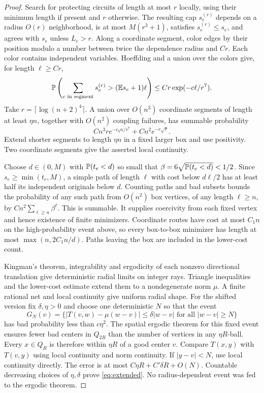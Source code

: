 \begin{proof}
Search for protecting circuits of length at most $r$ locally, using their
minimum length if present and $r$ otherwise. The resulting cap $s_e^{(r)}$
depends on a radius $O(r)$ neighborhood, is at most $M(r^3+1)$, satisfies
$s_e^{(r)}\le s_e$, and agrees with $s_e$ unless $L_e>r$.
Along a coordinate segment, color edges by their position modulo a number
between twice the dependence radius and $Cr$. Each color contains independent
variables. Hoeffding and a union over the colors give, for length $\ell\ge Cr$,
\[
 \mathbb P\left(\sum_{e\text{ in segment}}s_e^{(r)}>(\mathbb E s_e+1)\ell\right)
 \le Cr\exp(-c\ell/r^7).
\]
Take $r=\lceil\log(n+2)^4\rceil$. A union over $O(n^3)$ coordinate segments
of length at least $\eta n$, together with $O(n^2)$ coupling failures, has
summable probability
\[
 Cn^3r e^{-c_\eta n/r^7}+Cn^2e^{-c\sqrt r}.
\]
Extend shorter segments to length $\eta n$ in a fixed larger box and use
positivity. Two coordinate segments give the asserted local continuity.

Choose $d\in(0,M)$ with $\mathbb P(t_e<d)$ so small that
$\beta=6\sqrt{\mathbb P(t_e<d)}<1/2$. Since $s_e\ge\min(t_e,M)$, a simple
path of length $\ell$ with cost below $d\ell/2$ has at least half its
independent originals below $d$. Counting paths and bad subsets bounds the
probability of any such path from $O(n^2)$ box vertices, of any length
$\ell\ge n$, by $Cn^2\sum_{\ell\ge n}\beta^\ell$. This is summable.
It supplies coercivity from each fixed vertex and hence existence of finite
minimizers. Coordinate routes have cost at most $C_1n$ on the high-probability
event above, so every box-to-box minimizer has length at most
$\max(n,2C_1n/d)$. Paths leaving the box are included in the lower-cost count.

Kingman's theorem, integrability and ergodicity of each nonzero directional
translation give deterministic radial limits on integer rays. Triangle
inequalities and the lower-cost estimate extend them to a nondegenerate norm
$\mu$. A finite rational net and local continuity give uniform radial shape.
For the shifted version fix $\delta,\eta>0$ and choose one deterministic $N$
so that the event
\[
 G_N(v)=\{|T(v,w)-\mu(w-v)|\le\delta|w-v|
                 \text{ for all }|w-v|\ge N\}
\]
has bad probability less than $c\eta^2$. The spatial ergodic theorem for
this fixed event ensures fewer bad centers in $Q_{2R}$ than the number
of vertices in any $\eta R$-ball. Every $x\in Q_R$ is therefore within
$\eta R$ of a good center $v$. Compare $T(x,y)$ with $T(v,y)$ using local
continuity and norm continuity. If $|y-v|<N$, use local continuity directly.
The error is at most $C\eta R+C'\delta R+O(N)$. Countable decreasing choices
of $\eta,\delta$ prove \eqref{eq:extended}. No radius-dependent event was
fed to the ergodic theorem.
\end{proof}


